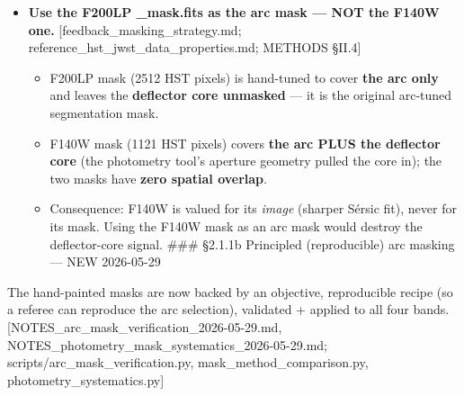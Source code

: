 \documentclass[
]{article}
\providecommand{\tightlist}{%
  \setlength{\itemsep}{0pt}\setlength{\parskip}{0pt}}
\newcommand{\BreakablePath}[1]{{\ttfamily\sloppy #1}}
\begin{document}
\begin{itemize}
\tightlist
\item
  \textbf{Use the F200LP
  \BreakablePath{\_\discretionary{}{}{}mask.\discretionary{}{}{}fits} as
  the arc mask --- NOT the F140W one.}
  {[}feedback\_masking\_strategy.md;
  reference\_hst\_jwst\_data\_properties.md; METHODS §II.4{]}

  \begin{itemize}
  \tightlist
  \item
    F200LP mask (2512 HST pixels) is hand-tuned to cover \textbf{the arc
    only} and leaves the \textbf{deflector core unmasked} --- it is the
    original arc-tuned segmentation mask.
  \item
    F140W mask (1121 HST pixels) covers \textbf{the arc PLUS the
    deflector core} (the photometry tool's aperture geometry pulled the
    core in); the two masks have \textbf{zero spatial overlap}.
  \item
    Consequence: F140W is valued for its \emph{image} (sharper Sérsic
    fit), never for its mask. Using the F140W mask as an arc mask would
    destroy the deflector-core signal. \#\#\# §2.1.1b Principled
    (reproducible) arc masking --- NEW 2026-05-29
  \end{itemize}
\end{itemize}

The hand-painted masks are now backed by an objective, reproducible
recipe (so a referee can reproduce the arc selection), validated +
applied to all four bands.
{[}\BreakablePath{NOTES\_\discretionary{}{}{}arc\_\discretionary{}{}{}mask\_\discretionary{}{}{}verification\_\discretionary{}{}{}2026-\discretionary{}{}{}05-\discretionary{}{}{}29.\discretionary{}{}{}md},
\BreakablePath{NOTES\_\discretionary{}{}{}photometry\_\discretionary{}{}{}mask\_\discretionary{}{}{}systematics\_\discretionary{}{}{}2026-\discretionary{}{}{}05-\discretionary{}{}{}29.\discretionary{}{}{}md};
\BreakablePath{scripts/\discretionary{}{}{}arc\_\discretionary{}{}{}mask\_\discretionary{}{}{}verification.\discretionary{}{}{}py},
\BreakablePath{mask\_\discretionary{}{}{}method\_\discretionary{}{}{}comparison.\discretionary{}{}{}py},
\BreakablePath{photometry\_\discretionary{}{}{}systematics.\discretionary{}{}{}py}{]}
\end{document}
